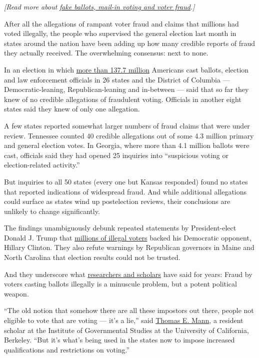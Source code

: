 \emph{{[}Read more about}
\href{https://www.nytimes3xbfgragh.onion/article/mail-in-vote-fraud-ballot.html}{\emph{fake
ballots, mail-in voting and voter fraud}}\emph{.{]}}

After all the allegations of rampant voter fraud and claims that
millions had voted illegally, the people who supervised the general
election last month in states around the nation have been adding up how
many credible reports of fraud they actually received. The overwhelming
consensus: next to none.

In an election in which \href{http://www.electproject.org/2016g}{more
than 137.7 million} Americans cast ballots, election and law enforcement
officials in 26 states and the District of Columbia ---
Democratic-leaning, Republican-leaning and in-between --- said that so
far they knew of no credible allegations of fraudulent voting. Officials
in another eight states said they knew of only one allegation.

A few states reported somewhat larger numbers of fraud claims that were
under review. Tennessee counted 40 credible allegations out of some 4.3
million primary and general election votes. In Georgia, where more than
4.1 million ballots were cast, officials said they had opened 25
inquiries into ``suspicious voting or election-related activity.''

But inquiries to all 50 states (every one but Kansas responded) found no
states that reported indications of widespread fraud. And while
additional allegations could surface as states wind up postelection
reviews, their conclusions are unlikely to change significantly.

The findings unambiguously debunk repeated statements by President-elect
Donald J. Trump that
\href{https://www.nytimes3xbfgragh.onion/2016/11/27/us/politics/trump-adviser-steps-up-searing-attack-on-romney.html}{millions
of illegal voters} backed his Democratic opponent, Hillary Clinton. They
also refute warnings by Republican governors in Maine and North Carolina
that election results could not be trusted.

And they underscore what
\href{http://www.scholarsstrategynetwork.org/sites/default/files/ssn_key_findings_minnite_on_the_myth_of_voter_fraud.pdf}{researchers
and scholars} have said for years: Fraud by voters casting ballots
illegally is a minuscule problem, but a potent political weapon.

``The old notion that somehow there are all these impostors out there,
people not eligible to vote that are voting --- it's a lie,'' said
\href{https://www.brookings.edu/experts/thomas-e-mann/}{Thomas E. Mann},
a resident scholar at the Institute of Governmental Studies at the
University of California, Berkeley. ``But it's what's being used in the
states now to impose increased qualifications and restrictions on
voting.''


